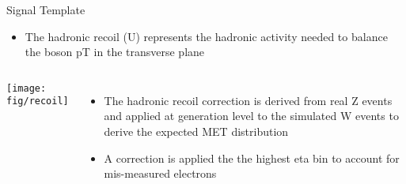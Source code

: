 \documentclass[8pt]{beamer}
\begin{document}
\begin{frame}{Signal Template}
  \begin{itemize}
  \item The hadronic recoil (U) represents the hadronic activity needed to balance the boson pT in the transverse plane
  \end{itemize}

  \begin{columns}[c]
    \texttt{[image: fig/recoil]}
  \begin{itemize}
  \item The hadronic recoil correction is derived from real Z events and applied at generation level to the simulated W events to derive the expected MET distribution
  \item A correction is applied the the highest eta bin to account for mis-measured electrons 
  \end{itemize}
  \end{columns}
\end{frame}
\end{document}
